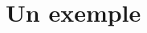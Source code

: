 \documentclass[10pt, a4paper]{article}
\newcommand{\codelatex}[2]{%
	}
\newcommand{\exlatex}[3][0.5]{%
		\medskip
		\begin{minipage}[h]{#1\textwidth}
			\codelatex{#2}{#3}
		\end{minipage}
		\hfill
		\begin{minipage}{0.85\textwidth - #1\textwidth}
			
		\end{minipage}
	}
\begin{document}
\section{Un exemple}

\lipsum[1]

\exlatex[0.5]{test01}{Une liste colorée}

\lipsum[2]

\newpage

\lstlistoflistings
\end{document}
